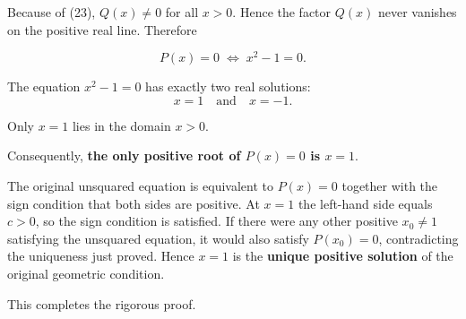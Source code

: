 \documentclass{article}
\begin{document}
Because of (23), \(Q(x)\neq0\) for all \(x>0\). Hence the factor \(Q(x)\) never vanishes on the positive real line. Therefore

\begin{equation}
P(x)=0
\;\Longleftrightarrow\;
x^2-1=0.
\tag{25}
\end{equation}

The equation \(x^2-1=0\) has exactly two real solutions:
\[
x=1
\quad\text{and}\quad
x=-1.
\]

Only \(x=1\) lies in the domain \(x>0\).

Consequently, \textbf{the only positive root of \(P(x)=0\) is \(x=1\)}.

The original unsquared equation is equivalent to \(P(x)=0\) together with the sign condition that both sides are positive. At \(x=1\) the left-hand side equals \(c>0\), so the sign condition is satisfied. If there were any other positive \(x_0\neq1\) satisfying the unsquared equation, it would also satisfy \(P(x_0)=0\), contradicting the uniqueness just proved. Hence \(x=1\) is the \textbf{unique positive solution} of the original geometric condition.

This completes the rigorous proof.
\end{document}
